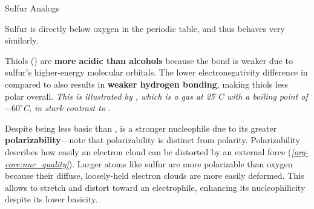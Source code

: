 \documentclass[10pt]{article}
\begin{document}
  \begin{core}[label=core:sulfur_analogs]{Sulfur Analogs}
    
    Sulfur is directly below oxygen in the periodic table, and thus behaves very similarly.

    Thiols () are \textbf{more acidic than alcohols} because the  bond is weaker due to sulfur's higher-energy molecular orbitals. The lower electronegativity difference in  compared to  also results in \textbf{weaker hydrogen bonding}, making thiols less polar overall. \textit{This is illustrated by , which is a gas at 25$^\circ$C with a boiling point of $-60^\circ$C, in stark contrast to .} 

    Despite being less basic than ,  is a stronger nucleophile due to its greater \textbf{polarizability}---note that polarizability is distinct from polarity. Polarizability describes how easily an electron cloud can be distorted by an external force (\textit{\autoref{org-core:nuc_quality}}). Larger atoms like sulfur are more polarizable than oxygen because their diffuse, loosely-held electron clouds are more easily deformed. This allows  to stretch and distort toward an electrophile, enhancing its nucleophilicity despite its lower basicity.

  \end{core} 
\end{document}
